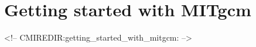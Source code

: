 
\chapter[Getting Started with MITgcm]{Getting started with MITgcm}
\begin{rawhtml}
<!-- CMIREDIR:getting_started_with_mitgcm: -->
\end{rawhtml}



\newpage


\newpage


\newpage


